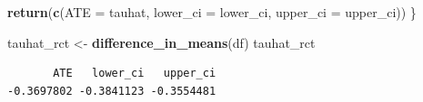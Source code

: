 \documentclass[
  shownotes,
  xcolor={svgnames},
  hyperref={colorlinks,citecolor=DarkBlue,linkcolor=DarkRed,urlcolor=DarkBlue}
  , aspectratio=169]{beamer}
\newenvironment{Shaded}{\begin{snugshade}}{\end{snugshade}}
\newcommand{\DataTypeTok}[1]{\textcolor[rgb]{0.13,0.29,0.53}{#1}}
\newcommand{\KeywordTok}[1]{\textcolor[rgb]{0.13,0.29,0.53}{\textbf{#1}}}
\newcommand{\NormalTok}[1]{#1}
\newcommand{\StringTok}[1]{\textcolor[rgb]{0.31,0.60,0.02}{#1}}
\begin{document}
\begin{frame}[fragile]
\begin{tiny}
\begin{Shaded}
\begin{Highlighting}[]
  \KeywordTok{return}\NormalTok{(}\KeywordTok{c}\NormalTok{(}\DataTypeTok{ATE =}\NormalTok{ tauhat, }\DataTypeTok{lower\_ci =}\NormalTok{ lower\_ci, }\DataTypeTok{upper\_ci =}\NormalTok{ upper\_ci))}
\NormalTok{\}}

\NormalTok{tauhat\_rct \textless{}{-}}\StringTok{ }\KeywordTok{difference\_in\_means}\NormalTok{(df)}
\NormalTok{tauhat\_rct}
\end{Highlighting}
\end{Shaded}
\end{tiny}

\begin{verbatim}
       ATE   lower_ci   upper_ci 
-0.3697802 -0.3841123 -0.3554481 
\end{verbatim}

\end{frame}
\end{document}
